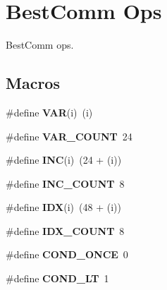 \hypertarget{group__BestCommOps}{}\section{Best\+Comm Ops}
\label{group__BestCommOps}


Best\+Comm ops.  


\subsection*{Macros}
\begin{DoxyCompactItemize}
\item 
\mbox{\label{group__BestCommOps_gaea1786a26de1ef1661d8396e996016e3}} 
\#define {\bfseries V\+AR}(i)~(i)
\item 
\mbox{\label{group__BestCommOps_gaf658c17633c26819ff687eb299c8da80}} 
\#define {\bfseries V\+A\+R\+\_\+\+C\+O\+U\+NT}~24
\item 
\mbox{\label{group__BestCommOps_gaf18b2a5d2ce185cf362e1e5682cc7d48}} 
\#define {\bfseries I\+NC}(i)~(24 + (i))
\item 
\mbox{\label{group__BestCommOps_gad54e147ec805de26f2ba5239a9f2f9a4}} 
\#define {\bfseries I\+N\+C\+\_\+\+C\+O\+U\+NT}~8
\item 
\mbox{\label{group__BestCommOps_ga5ffcf075590f79229c0cffcadbcb7884}} 
\#define {\bfseries I\+DX}(i)~(48 + (i))
\item 
\mbox{\label{group__BestCommOps_ga4112b74ea02b725106f711056aa59bec}} 
\#define {\bfseries I\+D\+X\+\_\+\+C\+O\+U\+NT}~8
\item 
\mbox{\label{group__BestCommOps_ga2811ff74e6c0cdbc8cdfb6abd9331a4c}} 
\#define {\bfseries C\+O\+N\+D\+\_\+\+O\+N\+CE}~0
\item 
\mbox{\label{group__BestCommOps_ga7253f036b82cbccf8be2c5822b33dc44}} 
\#define {\bfseries C\+O\+N\+D\+\_\+\+LT}~1
\item 
\mbox{\label{group__BestCommOps_gaff330b77d1058a2c6d5660c39d292979}} 

\end{DoxyCompactItemize}

